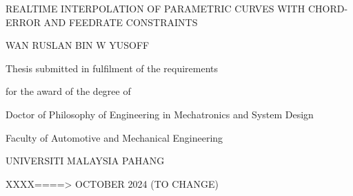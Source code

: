 \begin{titlepage}

\begin{center}
\bigskip
\end{center}

\begin{center}
\bigskip
\end{center}

\begin{center}
\bigskip
\end{center}

\begin{center}
REALTIME INTERPOLATION OF PARAMETRIC CURVES WITH CHORD-ERROR AND FEEDRATE CONSTRAINTS\par\vskip3cm

WAN RUSLAN BIN W YUSOFF\par\vskip3cm

Thesis submitted in fulfilment of the requirements\par
for the award of the degree of\par
Doctor of Philosophy of Engineering in Mechatronics and System Design\par
\vskip3cm

Faculty of Automotive and Mechanical Engineering\par
UNIVERSITI MALAYSIA PAHANG\par
\vskip3cm

XXXX====> OCTOBER 2024 (TO CHANGE)
\end{center}
\end{titlepage}
